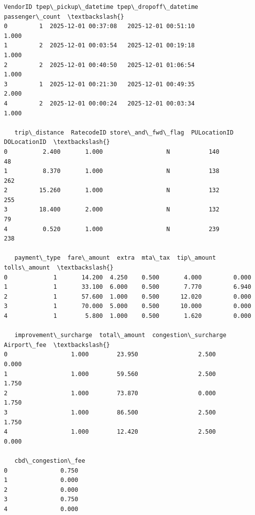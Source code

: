 \documentclass[11pt]{article}
\begin{document}
    
    \begin{Verbatim}[commandchars=\\\{\}]
   VendorID tpep\_pickup\_datetime tpep\_dropoff\_datetime  passenger\_count  \textbackslash{}
0         1  2025-12-01 00:37:08   2025-12-01 00:51:10            1.000   
1         2  2025-12-01 00:03:54   2025-12-01 00:19:18            1.000   
2         2  2025-12-01 00:40:50   2025-12-01 01:06:54            1.000   
3         1  2025-12-01 00:21:30   2025-12-01 00:49:35            2.000   
4         2  2025-12-01 00:00:24   2025-12-01 00:03:34            1.000   

   trip\_distance  RatecodeID store\_and\_fwd\_flag  PULocationID  DOLocationID  \textbackslash{}
0          2.400       1.000                  N           140            48   
1          8.370       1.000                  N           138           262   
2         15.260       1.000                  N           132           255   
3         18.400       2.000                  N           132            79   
4          0.520       1.000                  N           239           238   

   payment\_type  fare\_amount  extra  mta\_tax  tip\_amount  tolls\_amount  \textbackslash{}
0             1       14.200  4.250    0.500       4.000         0.000   
1             1       33.100  6.000    0.500       7.770         6.940   
2             1       57.600  1.000    0.500      12.020         0.000   
3             1       70.000  5.000    0.500      10.000         0.000   
4             1        5.800  1.000    0.500       1.620         0.000   

   improvement\_surcharge  total\_amount  congestion\_surcharge  Airport\_fee  \textbackslash{}
0                  1.000        23.950                 2.500        0.000   
1                  1.000        59.560                 2.500        1.750   
2                  1.000        73.870                 0.000        1.750   
3                  1.000        86.500                 2.500        1.750   
4                  1.000        12.420                 2.500        0.000   

   cbd\_congestion\_fee  
0               0.750  
1               0.000  
2               0.000  
3               0.750  
4               0.000  
    \end{Verbatim}
\end{document}
